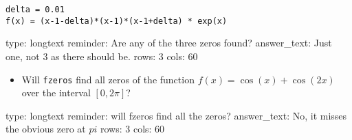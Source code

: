 \documentclass[12pt]{article}
\begin{document}
\begin{verbatim}
delta = 0.01
f(x) = (x-1-delta)*(x-1)*(x-1+delta) * exp(x)
\end{verbatim}
\begin{answer}
type: longtext
reminder: Are any of the three zeros found?
answer_text: Just one, not 3 as there should be. 
rows: 3
cols: 60
\end{answer}

\begin{itemize}
\itemsep1pt\parskip0pt
\item
  Will \texttt{fzeros} find all zeros of the function
  $f(x) = \cos(x) + \cos(2x)$ over the interval $[0,2\pi]$?
\end{itemize}

\begin{answer}
type: longtext
reminder: will fzeros find all the zeros?
answer_text: No, it misses the obvious zero at \( pi \) 
rows: 3
cols: 60
\end{answer}
\end{document}
